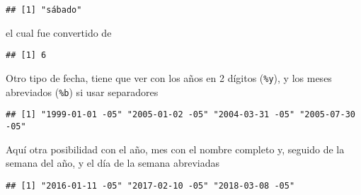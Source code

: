\documentclass[]{article}
\newenvironment{Shaded}{\begin{snugshade}}{\end{snugshade}}
\newcommand{\KeywordTok}[1]{\textcolor[rgb]{0.13,0.29,0.53}{\textbf{#1}}}
\newcommand{\StringTok}[1]{\textcolor[rgb]{0.31,0.60,0.02}{#1}}
\newcommand{\OperatorTok}[1]{\textcolor[rgb]{0.81,0.36,0.00}{\textbf{#1}}}
\newcommand{\NormalTok}[1]{#1}
\begin{document}
\begin{verbatim}
## [1] "sábado"
\end{verbatim}

el cual fue convertido de

\begin{Shaded}
\end{Shaded}

\begin{verbatim}
## [1] 6
\end{verbatim}

Otro tipo de fecha, tiene que ver con los años en 2 dígitos
(\texttt{\%y}), y los meses abreviados (\texttt{\%b}) si usar
separadores

\begin{Shaded}
\end{Shaded}

\begin{verbatim}
## [1] "1999-01-01 -05" "2005-01-02 -05" "2004-03-31 -05" "2005-07-30 -05"
\end{verbatim}

Aquí otra posibilidad con el año, mes con el nombre completo y, seguido
de la semana del año, y el día de la semana abreviadas

\begin{Shaded}
\end{Shaded}

\begin{verbatim}
## [1] "2016-01-11 -05" "2017-02-10 -05" "2018-03-08 -05"
\end{verbatim}
\end{document}
